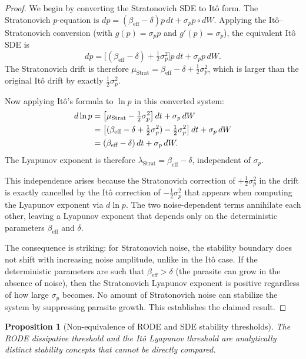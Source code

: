 \documentclass[12pt]{article}
\newtheorem{proposition}{Proposition}
\begin{document}
\begin{proof}
We begin by converting the Stratonovich SDE to It\^{o} form.  The Stratonovich $p$-equation is $dp = (\beta_{\text{eff}} - \delta)p\,dt + \sigma_p p \circ dW$.  Applying the It\^{o}--Stratonovich conversion (with $g(p) = \sigma_p p$ and $g'(p) = \sigma_p$), the equivalent It\^{o} SDE is
\begin{equation}
  dp = \bigl[(\beta_{\text{eff}} - \delta) + \tfrac{1}{2}\sigma_p^2\bigr]p\,dt + \sigma_p p\,dW.
\end{equation}
The Stratonovich drift is therefore $\mu_{\text{Strat}} = \beta_{\text{eff}} - \delta + \tfrac{1}{2}\sigma_p^2$, which is larger than the original It\^{o} drift by exactly $\tfrac{1}{2}\sigma_p^2$.

Now applying It\^{o}'s formula to $\ln p$ in this converted system:
\begin{align}
  d\ln p &= \bigl[\mu_{\text{Strat}} - \tfrac{1}{2}\sigma_p^2\bigr]\,dt + \sigma_p\,dW \notag \\
         &= \bigl[(\beta_{\text{eff}} - \delta + \tfrac{1}{2}\sigma_p^2) - \tfrac{1}{2}\sigma_p^2\bigr]\,dt + \sigma_p\,dW \notag \\
         &= (\beta_{\text{eff}} - \delta)\,dt + \sigma_p\,dW.
\end{align}
The Lyapunov exponent is therefore $\lambda_{\text{Strat}} = \beta_{\text{eff}} - \delta$, independent of $\sigma_p$.

This independence arises because the Stratonovich correction of $+\tfrac{1}{2}\sigma_p^2$ in the drift is exactly cancelled by the It\^{o} correction of $-\tfrac{1}{2}\sigma_p^2$ that appears when computing the Lyapunov exponent via $d\ln p$.  The two noise-dependent terms annihilate each other, leaving a Lyapunov exponent that depends only on the deterministic parameters $\beta_{\text{eff}}$ and $\delta$.

The consequence is striking: for Stratonovich noise, the stability boundary does not shift with increasing noise amplitude, unlike in the It\^{o} case.  If the deterministic parameters are such that $\beta_{\text{eff}} > \delta$ (the parasite can grow in the absence of noise), then the Stratonovich Lyapunov exponent is positive regardless of how large $\sigma_p$ becomes.  No amount of Stratonovich noise can stabilize the system by suppressing parasite growth.  This establishes the claimed result.
\end{proof}

\begin{proposition}[Non-equivalence of RODE and SDE stability thresholds]\label{prop:nonequiv}
The RODE dissipative threshold and the It\^{o} Lyapunov threshold are analytically distinct stability concepts that cannot be directly compared.
\end{proposition}
\end{document}
